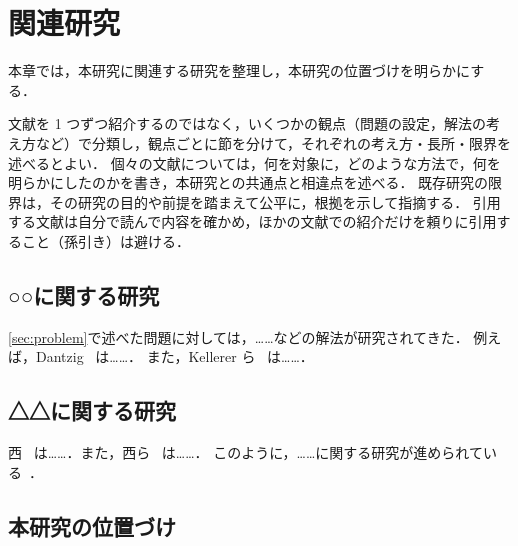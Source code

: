 \chapter{関連研究}
\label{chap:related-work}

本章では，本研究に関連する研究を整理し，本研究の位置づけを明らかにする．
\begin{writingnote}
文献を 1 つずつ紹介するのではなく，いくつかの観点（問題の設定，解法の考え方など）で分類し，観点ごとに節を分けて，それぞれの考え方・長所・限界を述べるとよい．
個々の文献については，何を対象に，どのような方法で，何を明らかにしたのかを書き，本研究との共通点と相違点を述べる．
既存研究の限界は，その研究の目的や前提を踏まえて公平に，根拠を示して指摘する．
引用する文献は自分で読んで内容を確かめ，ほかの文献での紹介だけを頼りに引用すること（孫引き）は避ける．
\end{writingnote}

\section{○○に関する研究}
\label{sec:related-a}

\cref{sec:problem}で述べた問題に対しては，……などの解法が研究されてきた．
例えば，Dantzig~\cite{dantzig1957discrete} は……．
また，Kellerer ら~\cite{kellerer2004knapsack} は……．

\section{△△に関する研究}
\label{sec:related-b}

西~\cite{nishi2020} は……．また，西ら~\cite{nishi2011} は……．
このように，……に関する研究が進められている~\cite{nishi2011,nishi2020,dantzig1957discrete}．

\section{本研究の位置づけ}
\label{sec:position}

